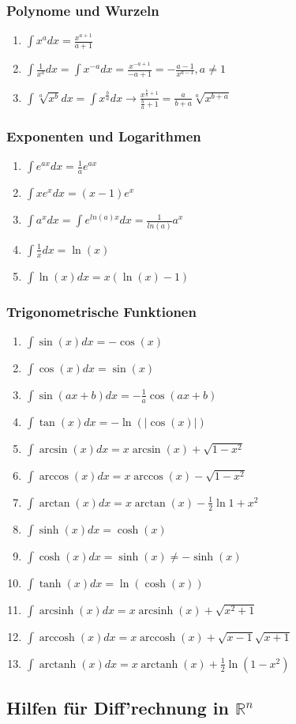 \documentclass[a4paper, 9pt, DIV=24]{scrartcl}
\DeclareMathOperator{\arcsinh}{arcsinh}
\DeclareMathOperator{\arccosh}{arccosh}
\DeclareMathOperator{\arctanh}{arctanh}
\begin{document}
\subsubsection{Polynome und Wurzeln}
\begin{enumerate}[label={(}\arabic*{)}]
 \item $\int x^a dx = \frac{x^{a+1}}{a+1}$
 \item $\int \frac{1}{x^a} dx = \int x^{-a} dx = \frac{x^{-a+1}}{-a+1} = -\frac{a-1}{x^{a-1}}, a \neq 1$
 \item $\int \sqrt[a]{x^b} dx = \int x^{\frac{b}{a}} dx \rightarrow \frac{x^{\frac{b}{a}+1}}{\frac{b}{a}+1} = \frac{a}{b+a}\sqrt[a]{x^{b+a}}$
\end{enumerate}
\subsubsection{Exponenten und Logarithmen}
\begin{enumerate}[label={(}\arabic*{)}]
 \item $\int e^{ax} dx = \frac{1}{a}e^{ax}$
 \item $\int xe^{x} dx = (x-1)e^{x}$
 \item $\int a^{x} dx = \int e^{ln(a)x} dx = \frac{1}{ln(a)}a^x$
 \item $\int \frac{1}{x} dx = \ln(x)$
 \item $\int \ln(x) dx = x(\ln(x)-1)$
\end{enumerate}
\subsubsection{Trigonometrische Funktionen}
\begin{enumerate}[label={(}\arabic*{)}]
 \item $\int \sin(x) dx = -\cos(x)$
 \item $\int \cos(x) dx = \sin(x)$
 \item $\int \sin(ax+b) dx = -\frac{1}{a}\cos(ax+b)$
 \item $\int \tan(x) dx = -\ln(|\cos(x)|)$
 \item $\int \arcsin(x) dx = x\arcsin(x) + \sqrt{1-x^2}$
 \item $\int \arccos(x) dx = x\arccos(x) - \sqrt{1-x^2}$
 \item $\int \arctan(x) dx = x\arctan(x) - \frac{1}{2}\ln{1+x^2}$
 \item $\int \sinh(x) dx = \cosh(x)$
 \item $\int \cosh(x) dx = \sinh(x) \neq -\sinh(x)$
 \item $\int \tanh(x) dx = \ln(\cosh(x))$
 \item $\int \arcsinh(x) dx = x\arcsinh(x) + \sqrt{x^2+1}$
 \item $\int \arccosh(x) dx = x\arccosh(x) + \sqrt{x-1}\sqrt{x+1}$
 \item $\int \arctanh(x) dx = x\arctanh(x) + \frac{1}{2}\ln(1-x^2)$
\end{enumerate}

\clearpage
\subsection{Hilfen für Diff'rechnung in $\mathbb{R}^n$}
\end{document}
